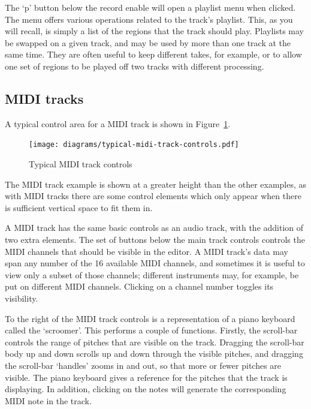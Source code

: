 \documentclass[10pt,a4paper]{book}
\newcommand{\todo}[1]{\marginpar{\small\texttt{#1}}}
\begin{document}
{The `p' button below the record enable will open a playlist menu when
clicked.  The menu offers various operations related to the track's
playlist.  This, as you will recall, is simply a list of the
regions that the track should play.  Playlists may be swapped on a
given track, and may be used by more than one track at the same time.
They are often useful to keep different takes, for example, or to
allow one set of regions to be played off two tracks with different
processing.

\todo{playlist menu details}


\subsection{MIDI tracks}

A typical control area for a MIDI track is shown in Figure~\ref{fig:typical-midi-track-controls}.

\begin{figure}[ht]
\begin{center}
\texttt{[image: diagrams/typical-midi-track-controls.pdf]}
\end{center}
\caption{Typical MIDI track controls}
\label{fig:typical-midi-track-controls}
\end{figure}

The MIDI track example is shown at a greater height than the other
examples, as with MIDI tracks there are some control elements which
only appear when there is sufficient vertical space to fit them in.

A MIDI track has the same basic controls as an audio track, with the
addition of two extra elements.  The set of buttons below the main
track controls controls the MIDI channels that should be visible in
the editor.  A MIDI track's data may span any number of the 16
available MIDI channels, and sometimes it is useful to view only a
subset of those channels; different instruments may, for example, be
put on different MIDI channels.  Clicking on a channel number toggles
its visibility.

\todo{What does Force do}

To the right of the MIDI track controls is a representation of a piano
keyboard called the `scroomer'.  This performs a couple of functions.
Firstly, the scroll-bar controls the range of pitches that are visible
on the track.  Dragging the scroll-bar body up and down scrolls up and
down through the visible pitches, and dragging the scroll-bar
`handles' zooms in and out, so that more or fewer pitches are visible.
The piano keyboard gives a reference for the pitches that the track is
displaying.  In addition, clicking on the notes will generate the
corresponding MIDI note in the track.




}
\end{document}
